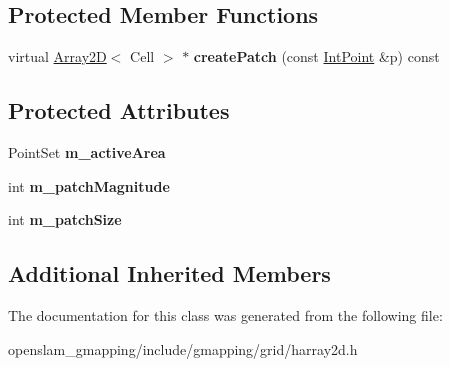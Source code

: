 \subsection*{Protected Member Functions}
\begin{DoxyCompactItemize}
\item 
\mbox{\label{classGMapping_1_1HierarchicalArray2D_a82fe8ba018a06140de5db598dd51b69a}} 
virtual \hyperlink{classGMapping_1_1Array2D}{Array2D}$<$ Cell $>$ $\ast$ {\bfseries create\+Patch} (const \hyperlink{structGMapping_1_1point}{Int\+Point} \&p) const
\end{DoxyCompactItemize}
\subsection*{Protected Attributes}
\begin{DoxyCompactItemize}
\item 
\mbox{\label{classGMapping_1_1HierarchicalArray2D_acfab704916dbd69cb898a75cf2601d51}} 
Point\+Set {\bfseries m\+\_\+active\+Area}
\item 
\mbox{\label{classGMapping_1_1HierarchicalArray2D_a4d051e715e956f822947f46029423c05}} 
int {\bfseries m\+\_\+patch\+Magnitude}
\item 
\mbox{\label{classGMapping_1_1HierarchicalArray2D_a836ab0931153bb262daf5dc282a228e4}} 
int {\bfseries m\+\_\+patch\+Size}
\end{DoxyCompactItemize}
\subsection*{Additional Inherited Members}


The documentation for this class was generated from the following file\+:\begin{DoxyCompactItemize}
\item 
openslam\+\_\+gmapping/include/gmapping/grid/harray2d.\+h\end{DoxyCompactItemize}
